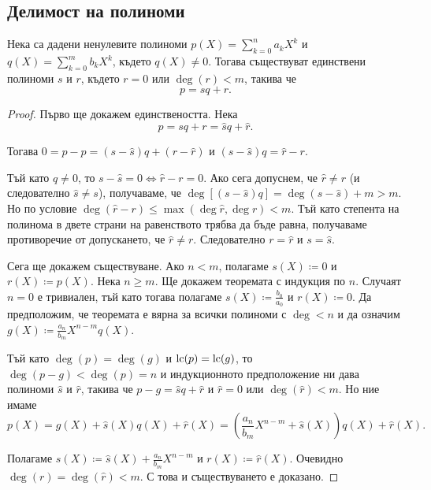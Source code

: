 \documentclass[numbers=endperiod, bibliography=totocnumbered]{scrartcl}
\begin{document}
\subsection{Делимост на полиноми}

\begin{theorem}\label{thm:polynomial_division}
  Нека са дадени ненулевите полиноми \( p(X) = \sum_{k=0}^n a_k X^k \) и \( q(X) = \sum_{k=0}^m b_k X^k \), където \( q(X) \neq 0 \). Тогава съществуват единствени полиноми \( s \) и \( r \), където \( r = 0 \) или \( \deg(r) < m \), такива че
  \begin{equation*}
    p = sq + r.
  \end{equation*}
\end{theorem}
\begin{proof}
  Първо ще докажем единствеността. Нека
  \begin{equation*}
    p = sq + r = \hat sq + \hat r.
  \end{equation*}

  Тогава \( 0 = p - p = (s - \hat s) q + (r - \hat r) \) и \( (s - \hat s) q = \hat r - r \).

  Тъй като \( q \neq 0 \), то \( s - \hat s = 0 \iff \hat r - r = 0 \). Ако сега допуснем, че \( \hat r \neq r \) (и следователно \( \hat s \neq s \)), получаваме, че \( \deg[(s - \hat s) q] = \deg(s - \hat s) + m > m \). Но по условие \( \deg(\hat r - r) \leq \max(\deg \hat r, \deg r) < m \). Тъй като степента на полинома в двете страни на равенството трябва да бъде равна, получаваме противоречие от допускането, че \( \hat r \neq r \). Следователно \( r = \hat r \) и \( s = \hat s \).

  Сега ще докажем съществуване. Ако \( n < m \), полагаме \( s(X) \coloneqq 0 \) и \( r(X) \coloneqq p(X) \). Нека \( n \geq m \). Ще докажем теоремата с индукция по \( n \). Случаят \( n = 0 \) е тривиален, тъй като тогава полагаме \( s(X) \coloneqq \frac {b_0} {a_0} \) и \( r(X) \coloneqq 0 \). Да предположим, че теоремата е вярна за всички полиноми с \( \deg < n \) и да означим \( g(X) \coloneqq \frac {a_n} {b_m} X^{n-m} q(X) \).

  Тъй като \( \deg(p) = \deg(g) \) и \( \operatorname{lc}(p) = \operatorname{lc}(g) \), то \( \deg(p - g) < \deg(p) = n \) и индукционното предположение ни дава полиноми \( \hat s \) и \( \hat r \), такива че \( p - g = \hat s q + \hat r \) и \( \hat r = 0 \) или \( \deg(\hat r) < m \). Но ние имаме
  \begin{equation*}
    p(X)
    =
    g(X) + \hat s(X) q(X) + \hat r(X)
    =
    \left( \frac {a_n} {b_m} X^{n-m} + \hat s(X) \right) q(X) + \hat r(X).
  \end{equation*}

  Полагаме \( s(X) \coloneqq \hat s(X) + \frac {a_n} {b_m} X^{n-m} \) и \( r(X) \coloneqq \hat r(X) \). Очевидно \( \deg(r) = \deg(\hat r) < m \). С това и съществуването е доказано.
\end{proof}
\end{document}
